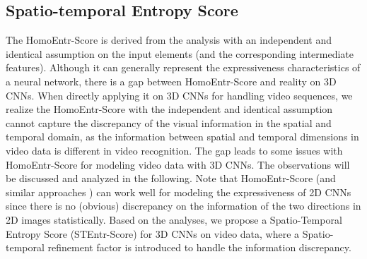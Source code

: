 \documentclass{article} \usepackage{iclr2023_conference,times}
\begin{document}
\subsection{Spatio-temporal Entropy Score}
The HomoEntr-Score is derived from the analysis with an independent and identical assumption on the input elements (and the corresponding intermediate features). Although it can generally represent the expressiveness characteristics of a neural network, there is a gap between HomoEntr-Score and reality on 3D CNNs. 
When directly applying it on 3D CNNs for handling video sequences, we realize the HomoEntr-Score with the independent and identical assumption cannot capture the discrepancy of the visual information in the spatial and temporal domain, as the information between spatial and temporal dimensions in video data is different in video recognition. 
The gap 
leads to some issues with HomoEntr-Score for modeling video data with 3D CNNs. The observations will be discussed and analyzed in the following. 
Note that HomoEntr-Score (and similar approaches \citep{sun2022mae}) can work well for modeling the expressiveness of 2D CNNs since there is no (obvious) discrepancy on the information of the two directions in 2D images statistically. 
Based on the analyses, we propose a Spatio-Temporal Entropy Score (STEntr-Score) for 3D CNNs on video data, where a Spatio-temporal refinement factor is introduced to handle the information discrepancy. 
\end{document}
